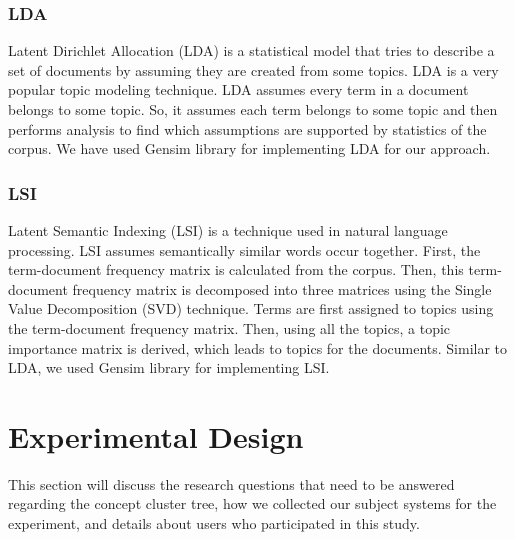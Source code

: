 \subsubsection{LDA}
Latent Dirichlet Allocation (LDA) \cite{blei2003latent} is a statistical model that tries to describe a set of documents by assuming they are created from some topics. LDA is a very popular topic modeling technique. LDA assumes every term in a document belongs to some topic. So, it assumes each term belongs to some topic and then performs analysis to find which assumptions are supported by statistics of the corpus. We have used Gensim \cite{gensim} library for implementing LDA for our approach.
\subsubsection{LSI}
Latent Semantic Indexing (LSI) \cite{deerwester1990indexing} is a technique used in natural language processing. LSI assumes semantically similar words occur together. First, the term-document frequency matrix is calculated from the corpus. Then, this term-document frequency matrix is decomposed into three matrices using the Single Value Decomposition (SVD) technique. Terms are first assigned to topics using the term-document frequency matrix. Then, using all the topics, a topic importance matrix is derived, which leads to topics for the documents. Similar to LDA, we used Gensim \cite{gensim} library for implementing LSI. 

\section{Experimental Design}
\label{Experimental}
This section will discuss the research questions that need to be answered regarding the concept cluster tree, how we collected our subject systems for the experiment, and details about users who participated in this study.
